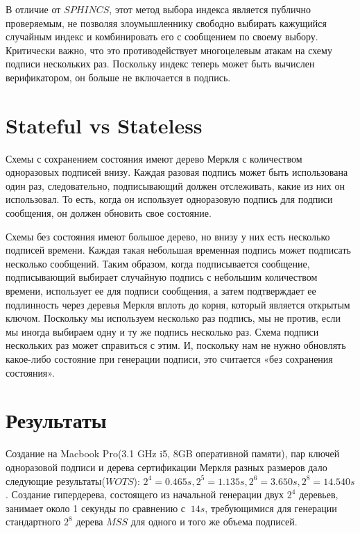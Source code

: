 \documentclass[a4paper, 14pt]{extarticle}
\begin{document}
В отличие от $SPHINCS$, этот метод выбора индекса является публично проверяемым, не позволяя злоумышленнику свободно выбирать кажущийся случайным индекс и комбинировать его с сообщением по своему выбору. Критически важно, что это противодействует многоцелевым атакам на схему подписи нескольких раз. Поскольку индекс теперь может быть вычислен верификатором, он больше не включается в подпись.
\newpage

\section{Stateful vs Stateless}
Схемы с сохранением состояния имеют дерево Меркля с количеством одноразовых подписей внизу. Каждая разовая подпись может быть использована один раз, следовательно, подписывающий должен отслеживать, какие из них он использовал. То есть, когда он использует одноразовую подпись для подписи сообщения, он должен обновить свое состояние.

Схемы без состояния имеют большое дерево, но внизу у них есть несколько подписей времени. Каждая такая небольшая временная подпись может подписать несколько сообщений. Таким образом, когда подписывается сообщение, подписывающий выбирает случайную подпись с небольшим количеством времени, использует ее для подписи сообщения, а затем подтверждает ее подлинность через деревья Меркля вплоть до корня, который является открытым ключом. Поскольку мы используем несколько раз подпись, мы не против, если мы иногда выбираем одну и ту же подпись несколько раз. Схема подписи нескольких раз может справиться с этим. И, поскольку нам не нужно обновлять какое-либо состояние при генерации подписи, это считается «без сохранения состояния».
\newpage

\section{Результаты}
Создание на Macbook Pro(3.1 GHz i5, 8GB оперативной памяти), пар ключей одноразовой подписи и дерева сертификации Меркля разных размеров дало следующие результаты($WOTS$): $2^4 = 0.465s, 2^5 = 1.135s, 2^6 = 3.650s, 2^8 = 14.540s$. Создание гипердерева, состоящего из начальной генерации двух $2^4$ деревьев, занимает около 1 секунды по сравнению с $~14s$, требующимися для генерации стандартного $2^8$ дерева $MSS$ для одного и того же объема подписей. 
\end{document}
